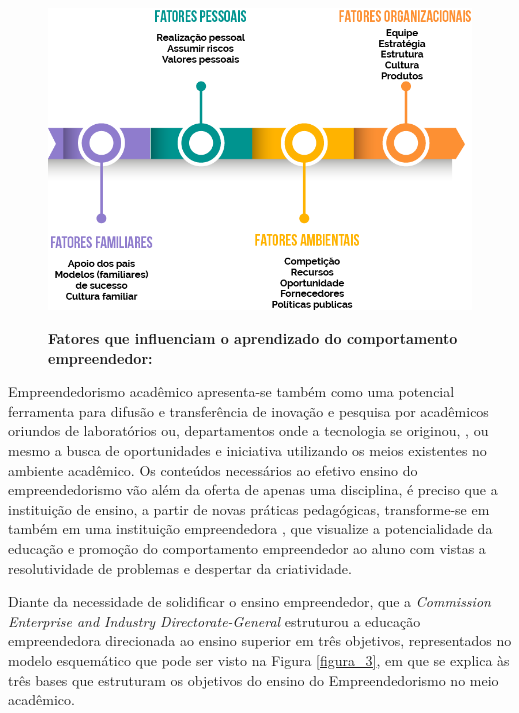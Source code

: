 \begin{figure}[!htb]
\centering
\caption{\textbf{Fatores que influenciam o aprendizado do comportamento empreendedor:}}
\includegraphics[scale=0.8]{Imagens/esquema_influencias_empreendedorismo.png}
\label{figura_2}
\end{figure}


Empreendedorismo acadêmico  apresenta-se também como uma potencial ferramenta para difusão e transferência de inovação e pesquisa por acadêmicos oriundos de laboratórios ou, departamentos onde a tecnologia se originou, \cite{guo_what_2019, abreu_nature_2013}, ou mesmo a busca de oportunidades e iniciativa utilizando os meios existentes no ambiente acadêmico. Os conteúdos necessários ao efetivo ensino do empreendedorismo vão além da oferta de apenas uma disciplina, é preciso que a instituição de ensino, a partir de novas práticas pedagógicas, transforme-se em também em uma instituição empreendedora \cite{campelli_empreendedorismo_2011}, que visualize a potencialidade da educação e promoção do comportamento empreendedor ao aluno com vistas a resolutividade de problemas \cite{degen_o_1989} e despertar da criatividade.

Diante da necessidade de solidificar o ensino empreendedor, que a \textit{Commission Enterprise and Industry Directorate-General} \cite{european_commission_best_2008} estruturou a educação empreendedora direcionada ao ensino superior em três objetivos, representados no modelo esquemático que pode ser visto na Figura \ref{figura_3}, em que se explica às três bases que estruturam os objetivos do ensino do Empreendedorismo no meio acadêmico. 

